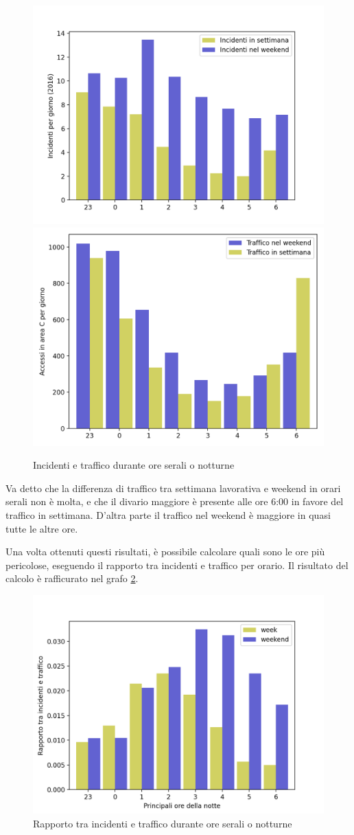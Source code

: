 \documentclass[a4paper]{report}
\begin{document}
\begin{figure}
    \includegraphics[width=0.5\linewidth]{../src/incidenti/incidenti_senza_coords/ore_punta/ore_notte.png}
    \includegraphics[width=0.48\linewidth]{../src/area_c/traffico_serale.png}
    \caption{Incidenti e traffico durante ore serali o notturne}
    \label{fig:ore-notte}
\end{figure}

Va detto che la differenza di traffico tra settimana lavorativa e weekend in orari serali non è molta, 
e che il divario maggiore è presente alle ore 6:00 in favore del traffico in settimana.
D'altra parte il traffico nel weekend è maggiore in quasi tutte le altre ore.

Una volta ottenuti questi risultati,  è possibile calcolare quali sono le ore più pericolose, 
eseguendo il rapporto tra incidenti e traffico per orario.
Il risultato del calcolo è rafficurato nel grafo \ref{fig:rapp-inc-traff}.

\begin{figure}
    \includegraphics[width=\linewidth]{../src/area_c/rapporto_inc_notte.png}
    \caption{Rapporto tra incidenti e traffico durante ore serali o notturne}
    \label{fig:rapp-inc-traff}
\end{figure}
\end{document}
